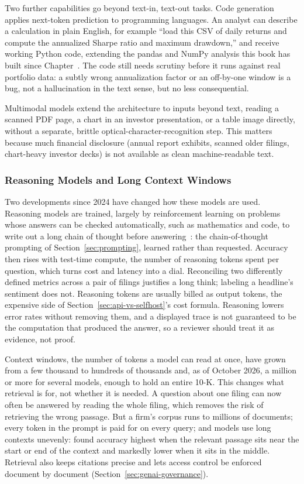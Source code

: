 \documentclass[../ai_in_finance]{subfiles}
\begin{document}
Two further capabilities go beyond text-in, text-out tasks. Code generation applies next-token prediction to programming languages. An analyst can describe a calculation in plain English, for example ``load this CSV of daily returns and compute the annualized Sharpe ratio and maximum drawdown,'' and receive working Python code, extending the pandas and NumPy analysis this book has built since Chapter~. The code still needs scrutiny before it runs against real portfolio data: a subtly wrong annualization factor or an off-by-one window is a bug, not a hallucination in the text sense, but no less consequential.

Multimodal models extend the architecture to inputs beyond text, reading a scanned PDF page, a chart in an investor presentation, or a table image directly, without a separate, brittle optical-character-recognition step. This matters because much financial disclosure (annual report exhibits, scanned older filings, chart-heavy investor decks) is not available as clean machine-readable text.

\subsubsection*{Reasoning Models and Long Context Windows}

Two developments since 2024 have changed how these models are used. Reasoning models are trained, largely by reinforcement learning on problems whose answers can be checked automatically, such as mathematics and code, to write out a long chain of thought before answering~\parencite{deepseek2025r1}: the chain-of-thought prompting of Section~\ref{sec:prompting}, learned rather than requested. Accuracy then rises with test-time compute, the number of reasoning tokens spent per question, which turns cost and latency into a dial. Reconciling two differently defined metrics across a pair of filings justifies a long think; labeling a headline's sentiment does not. Reasoning tokens are usually billed as output tokens, the expensive side of Section~\ref{sec:api-vs-selfhost}'s cost formula. Reasoning lowers error rates without removing them, and a displayed trace is not guaranteed to be the computation that produced the answer, so a reviewer should treat it as evidence, not proof.

Context windows, the number of tokens a model can read at once, have grown from a few thousand to hundreds of thousands and, as of October 2026, a million or more for several models, enough to hold an entire 10-K. This changes what retrieval is for, not whether it is needed. A question about one filing can now often be answered by reading the whole filing, which removes the risk of retrieving the wrong passage. But a firm's corpus runs to millions of documents; every token in the prompt is paid for on every query; and models use long contexts unevenly: \textcite{liu2024lost} found accuracy highest when the relevant passage sits near the start or end of the context and markedly lower when it sits in the middle. Retrieval also keeps citations precise and lets access control be enforced document by document (Section~\ref{sec:genai-governance}).
\end{document}

